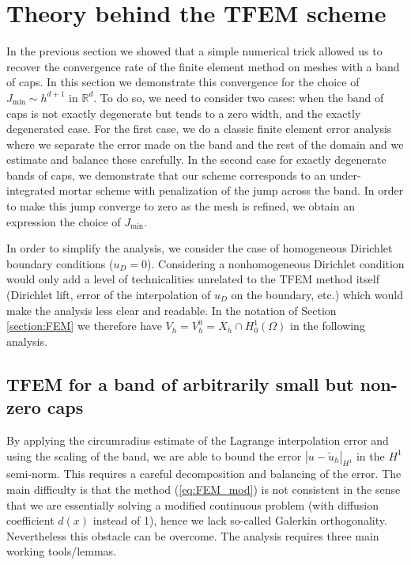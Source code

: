 \documentclass{article}
\theoremstyle{remark}
\def\tu{\tilde{u}}
\newcommand{\Jmin}{J_{\text{min}}}
\begin{document}
\section{Theory behind the TFEM scheme} \label{section:theoretical}
In the previous section we showed that a simple numerical trick allowed us to recover the convergence rate of the finite element method on meshes with a band of caps. In this section we demonstrate this convergence for the choice of $\Jmin \sim h^{d+1}$ in $\mathbb{R}^d$.  To do so, we need to consider two cases: when the band of caps is not exactly degenerate but tends to a zero width, and the exactly degenerated case. For the first case, we do a classic finite element error analysis where we separate the error made on the band and the rest of the domain and we estimate and balance these carefully. In the second case for exactly degenerate bands of caps, we demonstrate that our scheme corresponds to an under-integrated mortar scheme with penalization of the jump across the band. In order to make this jump converge to zero as the mesh is refined, we obtain an expression the choice of $\Jmin$. 

In order to simplify the analysis, we consider the case of homogeneous Dirichlet boundary conditions ($u_D=0$). Considering a nonhomogeneous Dirichlet condition would only add a level of technicalities unrelated to the TFEM method itself (Dirichlet lift, error of the interpolation of $u_D$ on the boundary, etc.) which would make the analysis less clear and readable. In the notation of Section \ref{section:FEM} we therefore have $V_h=V_h^0=X_h\cap H^1_0(\Omega)$ in the following analysis.

\subsection{TFEM for a band of arbitrarily small but non-zero caps}
\label{section:theoretical1}

By applying the circumradius estimate of the Lagrange interpolation error and using the scaling of the band, we are able to bound the error $|u-\tu_h|_{H^1}$ in the $H^1$ semi-norm. This requires a careful decomposition and balancing of the error. The main difficulty is that the method (\ref{eq:FEM_mod}) is not consistent in the sense that we are essentially solving a modified continuous problem (with diffusion coefficient $d(x)$ instead of 1), hence we lack so-called Galerkin orthogonality. Nevertheless this obstacle can be overcome. The analysis requires three main working tools/lemmas.
\end{document}
